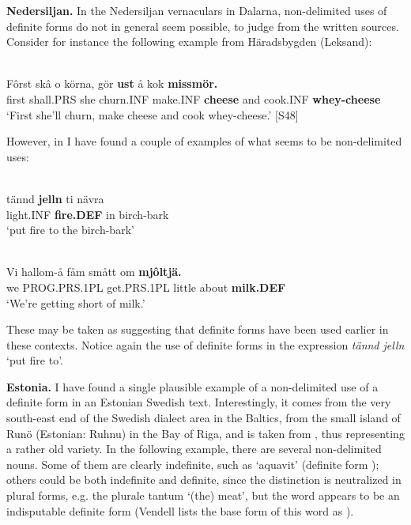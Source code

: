 \textbf{Nedersiljan.} In the Nedersiljan vernaculars in Dalarna, non-delimited uses of definite forms do not in general seem possible, to judge from the written sources. Consider for instance the following example from Häradsbygden (Leksand):

\ea \label{} 
\\
\gll Fôrst  skâ  o  körna,  gör  \textbf{ust} å  kok  \textbf{missmör.} \\
first  shall.PRS  she  churn.INF  make.INF  \textbf{cheese} and  cook.INF  \textbf{whey-cheese} \\
\glt ‘First she’ll churn, make cheese and cook whey-cheese.’ [S48]

\z

However, in \citet{LevanderEtAl1961-} I have found a couple of examples of what seems to be non-delimited uses:


\ea \label{} 
\\
\gll tännd  \textbf{jelln} ti  nävra\\
light.INF  \textbf{fire.DEF} in  birch-bark\\
\glt ‘put fire to the birch-bark’

\z

\ea \label{} 
\\
\gll Vi  hallom-å  fåm  smått  om  \textbf{mjôltjä.}\\
we  PROG.PRS.1PL  get.PRS.1PL  little  about  \textbf{milk.DEF}\\
\glt ‘We’re getting short of milk.’

\z

These may be taken as suggesting that definite forms have been used earlier in these contexts.  Notice again the use of definite forms in the expression \textit{tännd jelln} ‘put fire to’.


\textbf{Estonia.} I have found a single plausible example of a non-delimited use of a definite form in an Estonian Swedish text. Interestingly, it comes from the very south-east end of the Swedish dialect area in the Baltics, from the small island of Runö (Estonian: Ruhnu) in the Bay of Riga, and is taken from \citet{Vendell1882}, thus representing a rather old variety. In the following example, there are several non-delimited nouns. Some of them are clearly indefinite, such as  ‘aquavit’ (definite form ); others could be both indefinite and definite, since the distinction is neutralized in plural forms, e.g. the plurale tantum  ‘(the) meat’, but the word  appears to be an indisputable definite form (Vendell lists the base form of this word as ).

